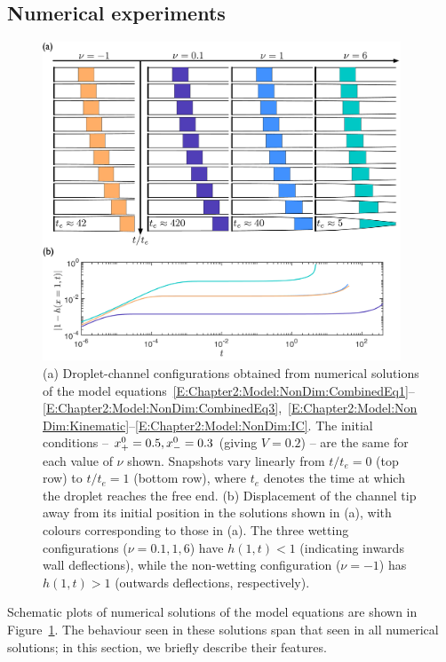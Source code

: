 \subsection{Numerical experiments}\label{S:Ch2:Numerics:Experiments}
\begin{figure}[h!]
\centering
\includegraphics[width = 0.95\textwidth]{Phenomenology}
\caption{(a) Droplet-channel configurations obtained from numerical solutions of the model equations~\eqref{E:Chapter2:Model:NonDim:CombinedEq1}--\eqref{E:Chapter2:Model:NonDim:CombinedEq3},~\eqref{E:Chapter2:Model:NonDim:Kinematic}--\eqref{E:Chapter2:Model:NonDim:IC}.  The initial conditions -- $x_{+}^0 = 0.5, x_{-}^0 = 0.3$ (giving $V = 0.2$) -- are the same for each value of $\nu$ shown. Snapshots vary linearly from $t/t_e = 0$ (top row) to $t/t_e = 1$ (bottom row), where $t_e$ denotes the time at which the droplet reaches the free end. (b) Displacement of the channel tip away from its initial position in the solutions shown in (a), with colours corresponding to those in (a). The three wetting configurations ($\nu = 0.1, 1,6$) have $h(1,t)<1$ (indicating inwards wall deflections), while the non-wetting configuration ($\nu = -1$) has $ h(1,t)>1$ (outwards deflections, respectively).}
\label{fig:Chapter2:Numerics:NumericalExperiments:Phenomenology}
\end{figure}
Schematic plots of numerical solutions of the model equations are shown in Figure~\ref{fig:Chapter2:Numerics:NumericalExperiments:Phenomenology}. The behaviour seen in these solutions span that seen in all numerical solutions; in this section, we briefly describe their features.

